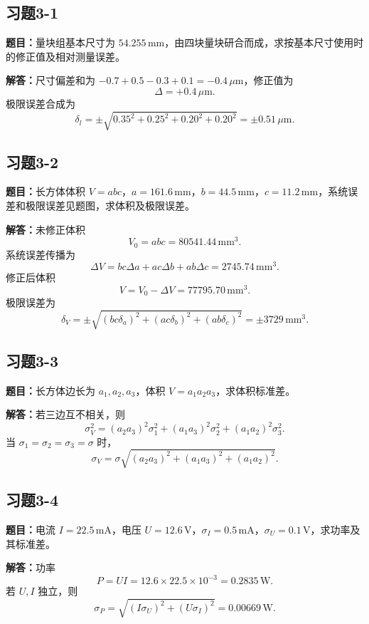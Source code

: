 \documentclass[UTF8,zihao=-4]{ctexart}
\newcommand{\problem}[1]{\subsection*{#1}}
\newcommand{\timu}{\noindent\textbf{题目：}}
\newcommand{\jieda}{\noindent\textbf{解答：}}
\begin{document}
{\problem{习题3-1}
\timu 量块组基本尺寸为 $54.255\,\mathrm{mm}$，由四块量块研合而成，求按基本尺寸使用时的修正值及相对测量误差。

\jieda 尺寸偏差和为 $-0.7+0.5-0.3+0.1=-0.4\,\mu\mathrm{m}$，修正值为
\begin{equation*}
    \Delta=+0.4\,\mu\mathrm{m}.
\end{equation*}
极限误差合成为
\begin{equation*}
    \delta_l=\pm\sqrt{0.35^2+0.25^2+0.20^2+0.20^2}=\pm0.51\,\mu\mathrm{m}.
\end{equation*}

\problem{习题3-2}
\timu 长方体体积 $V=abc$，$a=161.6\,\mathrm{mm}$，$b=44.5\,\mathrm{mm}$，$c=11.2\,\mathrm{mm}$，系统误差和极限误差见题图，求体积及极限误差。

\jieda 未修正体积
\begin{equation*}
    V_0=abc=80541.44\,\mathrm{mm^3}.
\end{equation*}
系统误差传播为
\begin{equation*}
    \Delta V=bc\Delta a+ac\Delta b+ab\Delta c=2745.74\,\mathrm{mm^3}.
\end{equation*}
修正后体积
\begin{equation*}
    V=V_0-\Delta V=77795.70\,\mathrm{mm^3}.
\end{equation*}
极限误差为
\begin{equation*}
    \delta_V=\pm\sqrt{(bc\delta_a)^2+(ac\delta_b)^2+(ab\delta_c)^2}
    =\pm3729\,\mathrm{mm^3}.
\end{equation*}

\problem{习题3-3}
\timu 长方体边长为 $a_1,a_2,a_3$，体积 $V=a_1a_2a_3$，求体积标准差。

\jieda 若三边互不相关，则
\begin{equation*}
    \sigma_V^2=(a_2a_3)^2\sigma_1^2+(a_1a_3)^2\sigma_2^2+(a_1a_2)^2\sigma_3^2.
\end{equation*}
当 $\sigma_1=\sigma_2=\sigma_3=\sigma$ 时，
\begin{equation*}
    \sigma_V=\sigma\sqrt{(a_2a_3)^2+(a_1a_3)^2+(a_1a_2)^2}.
\end{equation*}

\problem{习题3-4}
\timu 电流 $I=22.5\,\mathrm{mA}$，电压 $U=12.6\,\mathrm{V}$，$\sigma_I=0.5\,\mathrm{mA}$，$\sigma_U=0.1\,\mathrm{V}$，求功率及其标准差。

\jieda 功率
\begin{equation*}
    P=UI=12.6\times22.5\times10^{-3}=0.2835\,\mathrm{W}.
\end{equation*}
若 $U,I$ 独立，则
\begin{equation*}
    \sigma_P=\sqrt{(I\sigma_U)^2+(U\sigma_I)^2}=0.00669\,\mathrm{W}.
\end{equation*}

}
\end{document}
